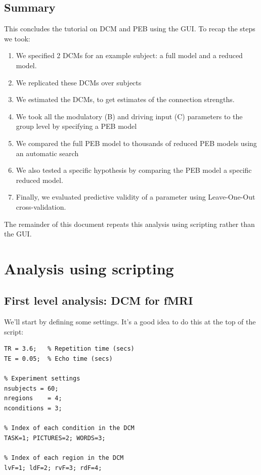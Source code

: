 \documentclass{article}
\begin{document}
\subsection{Summary} \label{GUI_summary}
This concludes the tutorial on DCM and PEB using the GUI. To recap the steps we took:
\begin{enumerate}
    \item We specified 2 DCMs for an example subject: a full model and a reduced model.
    \item We replicated these DCMs over subjects
    \item We estimated the DCMs, to get estimates of the connection strengths.
    \item We took all the modulatory (B) and driving input (C) parameters to the group level by specifying a PEB model
    \item We compared the full PEB model to thousands of reduced PEB models using an automatic search
    \item We also tested a specific hypothesis by comparing the PEB model a specific reduced model.
    \item Finally, we evaluated predictive validity of a parameter using Leave-One-Out cross-validation.
\end{enumerate}

The remainder of this document repeats this analysis using scripting rather than the GUI.


\section{Analysis using scripting}
\subsection{First level analysis: DCM for fMRI}

We'll start by defining some settings. It's a good idea to do this at the top of the script:

\begin{lstlisting}[style=Matlab-editor,caption=Settings]
% MRI scanner settings
TR = 3.6;   % Repetition time (secs)
TE = 0.05;  % Echo time (secs)

% Experiment settings
nsubjects = 60;
nregions    = 4; 
nconditions = 3;

% Index of each condition in the DCM
TASK=1; PICTURES=2; WORDS=3;

% Index of each region in the DCM
lvF=1; ldF=2; rvF=3; rdF=4;
\end{lstlisting}
\end{document}
